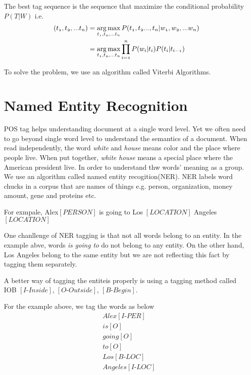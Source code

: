 \documentclass[12pt, oneside]{article}
\DeclareMathOperator*{\argmax}{arg\,max}
\begin{document}
The best tag sequence is the sequence that maximize the conditional probability $P(T|W)$ i.e.
\begin{align*}
\mathnormal{(t_1, t_2, ...t_n)} & = \mathnormal{\argmax_{t_1, t_2, ...t_n}P(t_1, t_2..., t_n|w_1, w_2, ...w_n)}\\
&= \mathnormal{\argmax_{t_1, t_2, ...t_n} \prod\limits_{i=1}^n P(w_i |t_i ) P(t_i |t_{i-1})}
\end{align*}

To solve the problem, we use an algorithm called Viterbi Algorithms. 

\section{Named Entity Recognition}
POS tag helps understanding document at a single word level. Yet we often need to go beyond single word level to understand the semantics of a document. When read independently, the word \textit{white} and \textit{house} means color and the place where people live. When put together, \textit{white house} means a special place where the American president live. In order to understand thw words' meaning as a group. We use an algorithm called named entity recogition(NER). NER labels word chucks in a corpus that are names of things e.g. person, organization, money amount, gene and proteins etc. 

For exmpale, {Alex$[PERSON]$ is going to Los $[LOCATION]$ Angeles $[LOCATION]$}

One chanllenge of NER tagging is that not all words belong to an entity. In the example abve, words \textit{is going to} do not belong to any entity. On the other hand, Los Angeles belong to the same entity but we are not reflecting this fact by tagging them separately. 

A better way of tagging the entiteis properly is using a tagging method called IOB $[\textit{I-Inside}]$, $[\textit{O-Outside}]$, $[\textit{B-Begin}]$.

For the example above, we tag the words as below
\begin{align*}
&{Alex} [\textit{I-PER}]\\
&\textit{is} [\textit{O}]\\
&\textit{going} [\textit{O}]\\
&\textit{to} [\textit{O}]\\
&\textit{Los} [\textit{B-LOC}]\\
&\textit{Angeles} [\textit{I-LOC}]
\end{align*}
\end{document}
